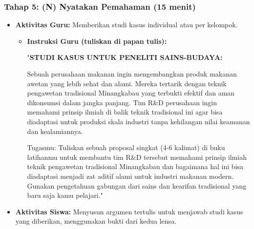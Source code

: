 \documentclass[a4paper,12pt]{article}
\begin{document}
\subsubsection{Tahap 5: (N) Nyatakan Pemahaman (15 menit)}
\begin{itemize}
\item \textbf{Aktivitas Guru:} Memberikan studi kasus individual atau per kelompok.
    \begin{itemize}
    \item \textbf{Instruksi Guru (tuliskan di papan tulis):}
    
    "\textbf{STUDI KASUS UNTUK PENELITI SAINS-BUDAYA:}
    
    Sebuah perusahaan makanan ingin mengembangkan produk makanan awetan yang lebih sehat dan alami. Mereka tertarik dengan teknik pengawetan tradisional Minangkabau yang terbukti efektif dan aman dikonsumsi dalam jangka panjang. Tim R\&D perusahaan ingin memahami prinsip ilmiah di balik teknik tradisional ini agar bisa diadaptasi untuk produksi skala industri tanpa kehilangan nilai keamanan dan kealamiannya.
    
    Tugasmu: Tuliskan sebuah proposal singkat (4-6 kalimat) di buku latihanmu untuk membantu tim R\&D tersebut memahami prinsip ilmiah teknik pengawetan tradisional Minangkabau dan bagaimana hal ini bisa diadaptasi menjadi zat aditif alami untuk industri makanan modern. Gunakan pengetahuan gabungan dari sains dan kearifan tradisional yang baru saja kamu pelajari."
    \end{itemize}
\item \textbf{Aktivitas Siswa:} Menyusun argumen tertulis untuk menjawab studi kasus yang diberikan, menggunakan bukti dari kedua lensa.
\end{itemize}
\end{document}

